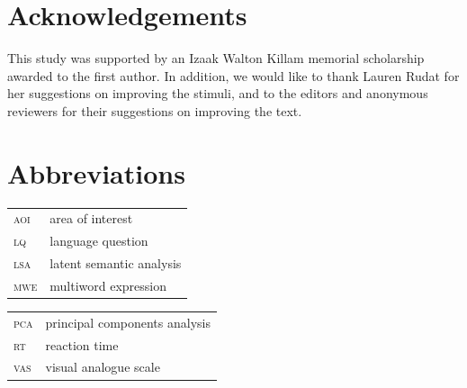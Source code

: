 \documentclass[output=paper
,modfonts
,nonflat]{langsci/langscibook}
\begin{document}





\section*{Acknowledgements}

This study was supported by an Izaak Walton Killam memorial scholarship awarded to the first author. In addition, we would like to thank Lauren Rudat for her suggestions on improving the stimuli, and to the editors and anonymous reviewers for their suggestions on improving the text.

\newpage
\section*{Abbreviations}



\begin{tabularx}{.48\textwidth}{ll}
\textsc{aoi} & area of interest  \\
\textsc{lq} & language question   \\
\textsc{lsa} & latent semantic analysis  \\
\textsc{mwe} & multiword expression \\
\end{tabularx}
\begin{tabularx}{.48\textwidth}{ll}
\textsc{pca} & principal components analysis  \\
\textsc{rt} & reaction time   \\
\textsc{vas} & visual analogue scale   \\
\end{tabularx}
\end{document}
